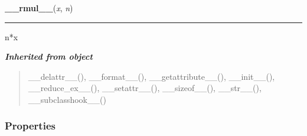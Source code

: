     \label{posix:stat_result:__rmul__}

    \vspace{0.5ex}

\hspace{.8\funcindent}\begin{boxedminipage}{\funcwidth}

    \raggedright \textbf{\_\_rmul\_\_}(\textit{x}, \textit{n})

    \vspace{-1.5ex}

    \rule{\textwidth}{0.5\fboxrule}
\setlength{\parskip}{2ex}
    n*x

\setlength{\parskip}{1ex}
    \end{boxedminipage}


\large{\textbf{\textit{Inherited from object}}}

\begin{quote}
\_\_delattr\_\_(), \_\_format\_\_(), \_\_getattribute\_\_(), \_\_init\_\_(), \_\_reduce\_ex\_\_(), \_\_setattr\_\_(), \_\_sizeof\_\_(), \_\_str\_\_(), \_\_subclasshook\_\_()
\end{quote}


  \subsubsection{Properties}

